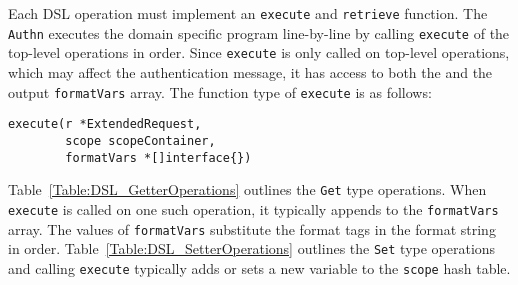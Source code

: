 
Each DSL operation must implement an \lstinline{execute} and \lstinline{retrieve} function. The \lstinline{Authn} executes the domain specific program line-by-line by calling \lstinline{execute} of the top-level operations in order. Since \lstinline{execute} is only called on top-level operations, which may affect the authentication message, it has access to both the  and the output \lstinline{formatVars} array. The function type of \lstinline{execute} is as follows:



\begin{lstlisting}[float=h]
execute(r *ExtendedRequest, 
        scope scopeContainer, 
        formatVars *[]interface{})
\end{lstlisting}

Table~\ref{Table:DSL_GetterOperations} outlines the \lstinline{Get} type operations. When \lstinline{execute} is called on one such operation, it typically appends to the \lstinline{formatVars} array. The values of \lstinline{formatVars} substitute the format tags in the format string in order. Table~\ref{Table:DSL_SetterOperations} outlines the \lstinline{Set} type operations and calling \lstinline{execute} typically adds or sets a new variable to the \lstinline{scope} hash table.



